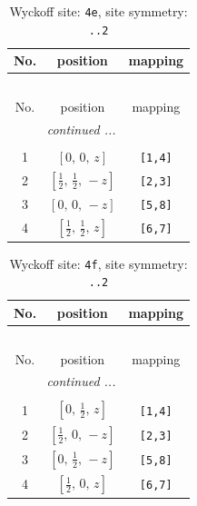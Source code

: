 \documentclass[fleqn,8pt]{jsarticle}
\begin{document}
\begin{longtable}{ccc}
\caption{Wyckoff site: {\tt 4e}, site symmetry: {\tt ..2}}
 \\
 \hline \hline
No. & position & mapping \\ \hline \endfirsthead

\multicolumn{2}{l}{\tablename\ \thetable{}} \\
 \hline \hline
No. & position & mapping \\ \hline \endhead

 \hline \hline
\multicolumn{2}{r}{\footnotesize\it continued ...} \\ \endfoot

 \hline \hline
\multicolumn{2}{r}{} \\ \endlastfoot

1 & $\left[ 0,\, 0,\, z \right]$ & {\tt [1,4]} \\ \hline
2 & $\left[ \frac{1}{2},\, \frac{1}{2},\, - z \right]$ & {\tt [2,3]} \\ \hline
3 & $\left[ 0,\, 0,\, - z \right]$ & {\tt [5,8]} \\ \hline
4 & $\left[ \frac{1}{2},\, \frac{1}{2},\, z \right]$ & {\tt [6,7]} \\
\end{longtable}
\renewcommand{\arraystretch}{1.2}
\begin{longtable}{ccc}
\caption{Wyckoff site: {\tt 4f}, site symmetry: {\tt ..2}}
 \\
 \hline \hline
No. & position & mapping \\ \hline \endfirsthead

\multicolumn{2}{l}{\tablename\ \thetable{}} \\
 \hline \hline
No. & position & mapping \\ \hline \endhead

 \hline \hline
\multicolumn{2}{r}{\footnotesize\it continued ...} \\ \endfoot

 \hline \hline
\multicolumn{2}{r}{} \\ \endlastfoot

1 & $\left[ 0,\, \frac{1}{2},\, z \right]$ & {\tt [1,4]} \\ \hline
2 & $\left[ \frac{1}{2},\, 0,\, - z \right]$ & {\tt [2,3]} \\ \hline
3 & $\left[ 0,\, \frac{1}{2},\, - z \right]$ & {\tt [5,8]} \\ \hline
4 & $\left[ \frac{1}{2},\, 0,\, z \right]$ & {\tt [6,7]} \\
\end{longtable}
\end{document}
